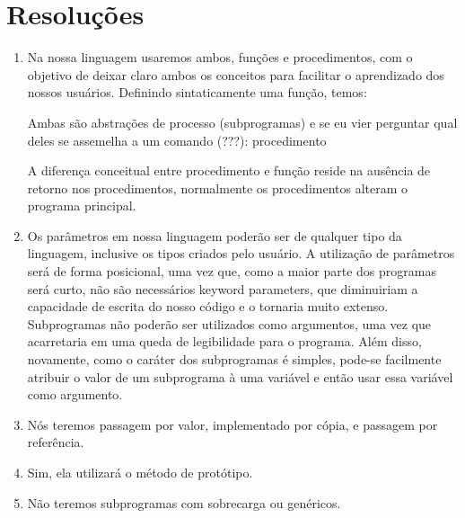 \documentclass[12pt, a4paper]{article}
\begin{document}
    \section{Resoluções}
        \begin{enumerate}
            \item
            Na nossa linguagem usaremos ambos, funções e procedimentos, com o objetivo de deixar claro ambos os conceitos para facilitar o aprendizado dos nossos usuários. Definindo sintaticamente uma função, temos:

            Ambas são abstrações de processo (subprogramas) e se eu vier perguntar qual deles se assemelha a um comando (???): procedimento
            \begin{comment}
            <function> 	::= function id "(" <parameters_list> ")" "{"
            <stmts> 
            <return> 
            "}"
            
            Definindo sintaticamente um procedimento, temos:
            
            <procedure>	::= procedure id "(" <parameters_list> ")" "{"
            			<stmts>
            			"}"
            \end{comment}
            A diferença conceitual entre procedimento e função reside na ausência de retorno nos procedimentos, normalmente os procedimentos alteram o programa principal.

            \item
            Os parâmetros em nossa linguagem poderão ser de qualquer tipo da linguagem, inclusive os tipos criados pelo usuário.
        	A utilização de parâmetros será de forma posicional, uma vez que, como a maior parte dos programas será curto, não são necessários keyword parameters, que diminuiriam a capacidade de escrita do nosso código e o tornaria muito extenso.
        	Subprogramas não poderão ser utilizados como argumentos, uma vez que acarretaria em uma queda de legibilidade para o programa. Além disso, novamente, como o caráter dos subprogramas é simples, pode-se facilmente atribuir o valor de um subprograma à uma variável e então usar essa variável como argumento.

            \item
            Nós teremos passagem por valor, implementado por cópia, e passagem por referência. 
            \item
            Sim, ela utilizará o método de protótipo.
            \item
            Não teremos subprogramas com sobrecarga ou genéricos.
	

\end{enumerate}
\end{document}
